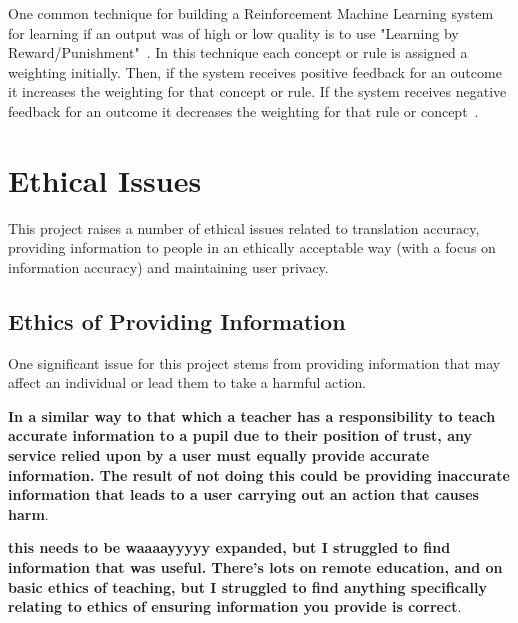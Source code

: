 \documentclass[authoryearcitations]{UoYCSproject}
\begin{document}
One common technique for building a Reinforcement Machine Learning system for learning if an output was of high or low quality is to use "Learning by Reward/Punishment"~\cite{kodratoff1988introduction}. In this technique each concept or rule is assigned a weighting initially. Then, if the system receives positive feedback for an outcome it increases the weighting for that concept or rule. If the system receives negative feedback for an outcome it decreases the weighting for that rule or concept~\cite{kodratoff1988introduction}.




\section{Ethical Issues}
This project raises a number of ethical issues related to translation accuracy, providing information to people in an ethically acceptable way (with a focus on information accuracy) and maintaining user privacy.

\subsection{Ethics of Providing Information}
One significant issue for this project stems from providing information that may affect an individual or lead them to take a harmful action.


{\bf In a similar way to that which a teacher has a responsibility to teach accurate information to a pupil due to their position of trust, any service relied upon by a user must equally provide accurate information.  The result of not doing this could be providing inaccurate information that leads to a user carrying out an action that causes harm}.



{\bf this needs to be waaaayyyyy expanded, but I struggled to find information that was useful.  There's lots on remote education, and on basic ethics of teaching, but I struggled to find anything specifically relating to ethics of ensuring information you provide is correct}.
\end{document}
